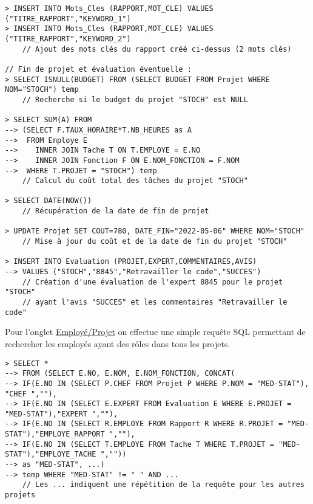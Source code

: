 \begin{verbatim}
> INSERT INTO Mots_Cles (RAPPORT,MOT_CLE) VALUES ("TITRE_RAPPORT","KEYWORD_1")
> INSERT INTO Mots_Cles (RAPPORT,MOT_CLE) VALUES ("TITRE_RAPPORT","KEYWORD_2")
    // Ajout des mots clés du rapport créé ci-dessus (2 mots clés)

// Fin de projet et évaluation éventuelle :
> SELECT ISNULL(BUDGET) FROM (SELECT BUDGET FROM Projet WHERE NOM="STOCH") temp
    // Recherche si le budget du projet "STOCH" est NULL

> SELECT SUM(A) FROM 
--> (SELECT F.TAUX_HORAIRE*T.NB_HEURES as A 
-->  FROM Employe E 
-->    INNER JOIN Tache T ON T.EMPLOYE = E.NO 
-->    INNER JOIN Fonction F ON E.NOM_FONCTION = F.NOM 
-->  WHERE T.PROJET = "STOCH") temp
    // Calcul du coût total des tâches du projet "STOCH"

> SELECT DATE(NOW())
    // Récupération de la date de fin de projet

> UPDATE Projet SET COUT=780, DATE_FIN="2022-05-06" WHERE NOM="STOCH"
    // Mise à jour du coût et de la date de fin du projet "STOCH"

> INSERT INTO Evaluation (PROJET,EXPERT,COMMENTAIRES,AVIS) 
--> VALUES ("STOCH","8845","Retravailler le code","SUCCES")
    // Création d'une évaluation de l'expert 8845 pour le projet "STOCH" 
    // ayant l'avis "SUCCES" et les commentaires "Retravailler le code"
\end{verbatim}

Pour l'onglet \href{http://ms8db.montefiore.ulg.ac.be/s191230/employe_project.php}{Employé/Projet} on effectue une simple requête SQL permettant de rechercher les employés ayant des rôles dans tous les projets.
\begin{verbatim}
> SELECT * 
--> FROM (SELECT E.NO, E.NOM, E.NOM_FONCTION, CONCAT(
--> IF(E.NO IN (SELECT P.CHEF FROM Projet P WHERE P.NOM = "MED-STAT"), "CHEF ",""),
--> IF(E.NO IN (SELECT E.EXPERT FROM Evaluation E WHERE E.PROJET = "MED-STAT"),"EXPERT ",""),
--> IF(E.NO IN (SELECT R.EMPLOYE FROM Rapport R WHERE R.PROJET = "MED-STAT"),"EMPLOYE_RAPPORT ",""),
--> IF(E.NO IN (SELECT T.EMPLOYE FROM Tache T WHERE T.PROJET = "MED-STAT"),"EMPLOYE_TACHE ",""))
--> as "MED-STAT", ...)
--> temp WHERE "MED-STAT" != " " AND ...
    // Les ... indiquent une répétition de la requête pour les autres projets
\end{verbatim}


